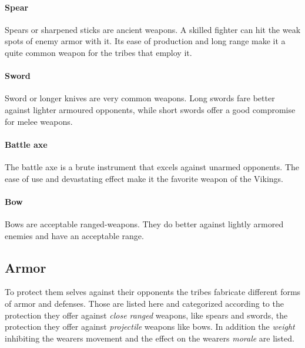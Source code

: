 \paragraph{Spear}
Spears or sharpened sticks are ancient weapons. A skilled fighter can hit the
weak spots of enemy armor with it. Its ease of production and long range make
it a quite common weapon for the tribes that employ it.

\paragraph{Sword}
Sword or longer knives are very common weapons. Long swords fare better against
lighter armoured opponents, while short swords offer a good compromise for
melee weapons.

\paragraph{Battle axe}
The battle axe is a brute instrument that excels against unarmed opponents. The
ease of use and devastating effect make it the favorite weapon of the
\gls{Vikings}.

\paragraph{Bow}
Bows are acceptable ranged-weapons. They do better against lightly armored
enemies and have an acceptable range.

\subsection{Armor}\label{ch:Goods:Armory:Armor}
To protect them selves against their opponents the tribes fabricate different
forms of armor and defenses. Those are listed here and categorized according to
the protection they offer against \emph{close ranged} weapons, like spears and
swords, the protection they offer against \emph{projectile} weapons like bows.
In addition the \emph{weight} inhibiting the wearers movement and the effect on
the wearers \emph{morale} are listed.

